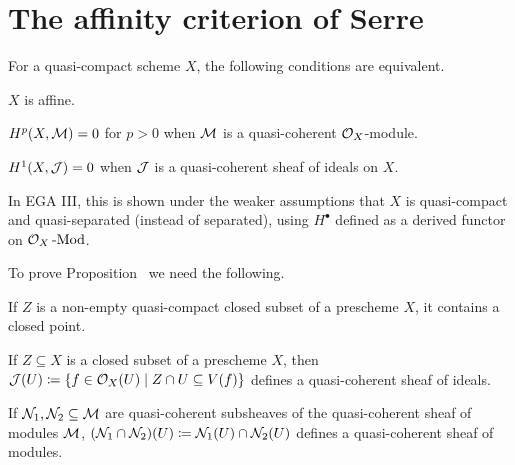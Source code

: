 \documentclass[a4paper,parskip=half,numbers=enddot, DIV=12]{scrreprt}
\begin{document}
\section{The affinity criterion of Serre}
\begin{prop}
	For a quasi-compact scheme $X$, the following conditions are equivalent.
	\begin{alphanumerate}
		\item $X$ is affine.
		\item $H^p(X,\mathcal{M})=0$ for $p>0$ when $\mathcal{M}$ is a quasi-coherent $\mathcal{O}_X$-module.
		\item $H^1(X,\mathcal{J})=0$ when $\mathcal{J}$ is a quasi-coherent sheaf of ideals on $X$.
	\end{alphanumerate}
\end{prop}
\begin{rem*}
	In EGA III, this is shown under the weaker assumptions that $X$ is quasi-compact and quasi-separated (instead of separated), using $H^\bullet $ defined as a derived functor on $\mathcal{O}_X\operatorname{-Mod}$.
\end{rem*}
To prove Proposition~ we need the following.
\begin{prop}
	\begin{alphanumerate}
		\item{} If $Z$ is a non-empty quasi-compact closed subset of a prescheme $X$, it contains a closed point.
		\item{} If $Z\subseteq X$ is a closed subset of a prescheme $X$, then $\mathcal{J}(U) \coloneqq \{f \in \mathcal{O}_X(U) \mid Z\cap U \subseteq V(f)\}$
defines a quasi-coherent sheaf of ideals.
	\item{} If $\mathcal{N}_1,\mathcal{N}_2\subseteq \mathcal{M}$ are quasi-coherent subsheaves of the quasi-coherent sheaf of modules $\mathcal{M}$, $(\mathcal{N}_1 \cap \mathcal{N}_2)(U) \coloneqq \mathcal{N}_1(U)\cap
\mathcal{N}_2(U)$ defines a quasi-coherent sheaf of modules.
	\end{alphanumerate}
\end{prop}
\end{document}
